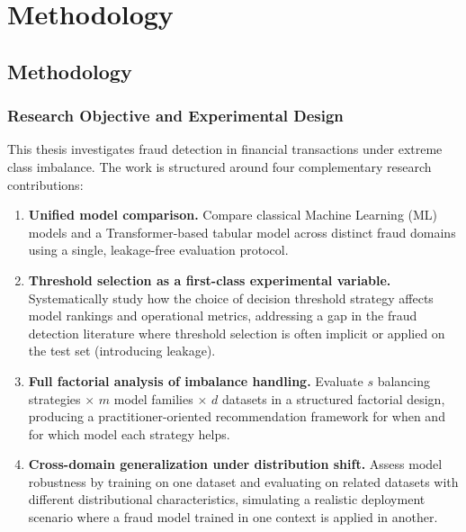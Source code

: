\chapter{Methodology}
\label{sec:chapterMethodology}

\section{Methodology}
\label{sec:methodology}

\subsection{Research Objective and Experimental Design}
\label{sec:objective}

This thesis investigates fraud detection in financial transactions under extreme class imbalance. The work is structured around four complementary research contributions:

\begin{enumerate}
  \item \textbf{Unified model comparison.} Compare classical Machine Learning (ML) models and a Transformer-based tabular model across distinct fraud domains using a single, leakage-free evaluation protocol.

  \item \textbf{Threshold selection as a first-class experimental variable.} Systematically study how the choice of decision threshold strategy affects model rankings and operational metrics, addressing a gap in the fraud detection literature where threshold selection is often implicit or applied on the test set (introducing leakage).

  \item \textbf{Full factorial analysis of imbalance handling.} Evaluate $s$ balancing strategies $\times$ $m$ model families $\times$ $d$ datasets in a structured factorial design, producing a practitioner-oriented recommendation framework for when and for which model each strategy helps.

  \item \textbf{Cross-domain generalization under distribution shift.} Assess model robustness by training on one dataset and evaluating on related datasets with different distributional characteristics, simulating a realistic deployment scenario where a fraud model trained in one context is applied in another.
\end{enumerate}

